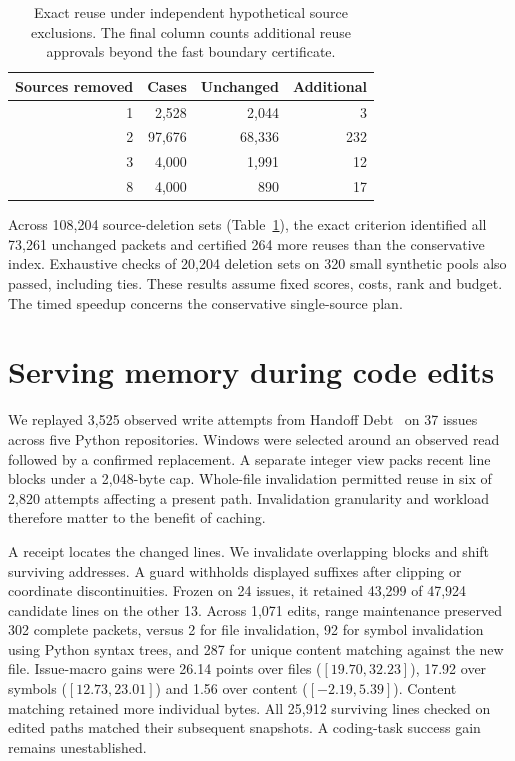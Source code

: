 \documentclass[conference]{IEEEtran}
\begin{document}
\balance
\begin{table}[t]
\caption{Exact reuse under independent hypothetical source exclusions. The final column counts additional reuse approvals beyond the fast boundary certificate.}
\centering\small
\begin{tabular}{rrrr}\toprule
Sources removed & Cases & Unchanged & Additional\\\midrule
1 & 2,528 & 2,044 & 3\\
2 & 97,676 & 68,336 & 232\\
3 & 4,000 & 1,991 & 12\\
8 & 4,000 & 890 & 17\\
\bottomrule\end{tabular}
\label{tab:exclusions}
\end{table}

Across 108,204 source-deletion sets (Table~\ref{tab:exclusions}), the exact criterion identified all 73,261 unchanged packets and certified 264 more reuses than the conservative index. Exhaustive checks of 20,204 deletion sets on 320 small synthetic pools also passed, including ties. These results assume fixed scores, costs, rank and budget. The timed speedup concerns the conservative single-source plan.

\section{Serving memory during code edits}
We replayed 3,525 observed write attempts from Handoff Debt~\cite{handoff} on 37 issues across five Python repositories. Windows were selected around an observed read followed by a confirmed replacement. A separate integer view packs recent line blocks under a 2,048-byte cap. Whole-file invalidation permitted reuse in six of 2,820 attempts affecting a present path. Invalidation granularity and workload therefore matter to the benefit of caching.

A receipt locates the changed lines. We invalidate overlapping blocks and shift surviving addresses. A guard withholds displayed suffixes after clipping or coordinate discontinuities. Frozen on 24 issues, it retained 43,299 of 47,924 candidate lines on the other 13. Across 1,071 edits, range maintenance preserved 302 complete packets, versus 2 for file invalidation, 92 for symbol invalidation using Python syntax trees, and 287 for unique content matching against the new file. Issue-macro gains were 26.14 points over files ($[19.70,32.23]$), 17.92 over symbols ($[12.73,23.01]$) and 1.56 over content ($[-2.19,5.39]$). Content matching retained more individual bytes. All 25,912 surviving lines checked on edited paths matched their subsequent snapshots. A coding-task success gain remains unestablished.
\end{document}
